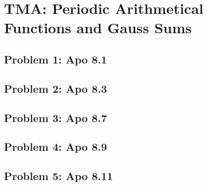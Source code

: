 \section{TMA: Periodic Arithmetical Functions and Gauss Sums}

\subsection[Problem 1]{Problem 1: Apo 8.1}

\subsection[Problem 2]{Problem 2: Apo 8.3}

\subsection[Problem 3]{Problem 3: Apo 8.7}

\subsection[Problem 4]{Problem 4: Apo 8.9}

\subsection[Problem 5]{Problem 5: Apo 8.11}